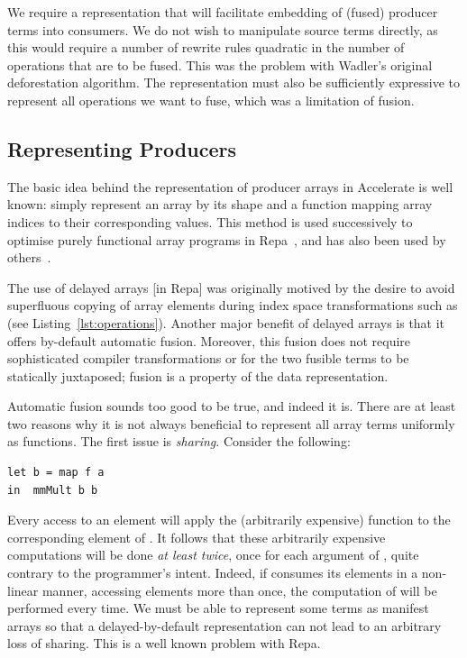 We require a representation that will facilitate embedding of (fused) producer
terms into consumers. We do not wish to manipulate source terms directly, as
this would require a number of rewrite rules quadratic in the number of
operations that are to be fused. This was the problem with Wadler's original
deforestation algorithm. The representation must also be sufficiently expressive
to represent all operations we want to fuse, which was a limitation of
 fusion.

\subsection{Representing Producers}
\label{sec:representing_producers}

The basic idea behind the representation of producer arrays in Accelerate is
well known: simply represent an array by its shape and a function mapping array
indices to their corresponding values. This method is used successively to
optimise purely functional array programs in Repa~\cite{Keller:2010er}, and has also been used by
others~\cite{Claessen:2012hl}.

The use of delayed arrays [in Repa] was originally motived by the desire to
avoid superfluous copying of array elements during index space transformations
such as  (see Listing~\ref{lst:operations}). Another major
benefit of delayed arrays is that it offers by-default automatic fusion.
Moreover, this fusion does not require sophisticated compiler transformations or
for the two fusible terms to be statically juxtaposed; fusion is a property of
the data representation.

Automatic fusion sounds too good to be true, and indeed it is. There are at
least two reasons why it is not always beneficial to represent all array terms
uniformly as functions. The first issue is \emph{sharing}. Consider the
following:
%
\begin{lstlisting}[style=haskell]
let b = map f a
in  mmMult b b
\end{lstlisting}
%
Every access to an element  will apply the (arbitrarily expensive)
function  to the corresponding element of . It follows that
these arbitrarily expensive computations will be done \emph{at least twice},
once for each argument of , quite contrary to the programmer's
intent. Indeed, if  consumes its elements in a non-linear manner,
accessing elements more than once, the computation of  will be performed
every time. We must be able to represent some terms as manifest arrays so that a
delayed-by-default representation can not lead to an arbitrary loss of sharing.
This is a well known problem with Repa.

